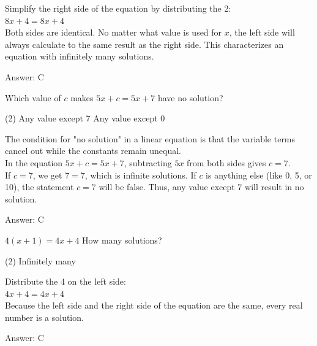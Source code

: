 \documentclass[11pt,paper=a4,answers]{exam}
\begin{document}
\begin{questions}
\begin{solution}
Simplify the right side of the equation by distributing the 2:
\\[10pt]
$8x + 4 = 8x + 4$ 
\\[10pt]
Both sides are identical. No matter what value is used for $x$, the left side will always calculate to the same result as the right side. This characterizes an equation with infinitely many solutions.

\vspace{20pt}
Answer: \colorbox{yellow!100}{C}
\end{solution}

\question
Which value of $c$ makes $5x + c = 5x + 7$ have no solution?
\begin{tasks}(2)
    \task Any value except 7
    \task Any value except 0
\end{tasks}

\begin{solution}
The condition for "no solution" in a linear equation is that the variable terms cancel out while the constants remain unequal. 
\\[10pt]
In the equation $5x + c = 5x + 7$, subtracting $5x$ from both sides gives $c = 7$. 
\\[10pt]
If $c = 7$, we get $7 = 7$, which is infinite solutions. If $c$ is anything else (like 0, 5, or 10), the statement $c = 7$ will be false. Thus, any value except 7 will result in no solution.

\vspace{20pt}
Answer: \colorbox{yellow!100}{C}
\end{solution}

\question
$4(x + 1) = 4x + 4$
How many solutions?
\begin{tasks}(2)
    \task Infinitely many
\end{tasks}

\begin{solution}
Distribute the 4 on the left side:
\\[10pt]
$4x + 4 = 4x + 4$ 
\\[10pt]
Because the left side and the right side of the equation are the same, every real number is a solution.

\vspace{20pt}
Answer: \colorbox{yellow!100}{C}
\end{solution}


\end{questions}
\end{document}
